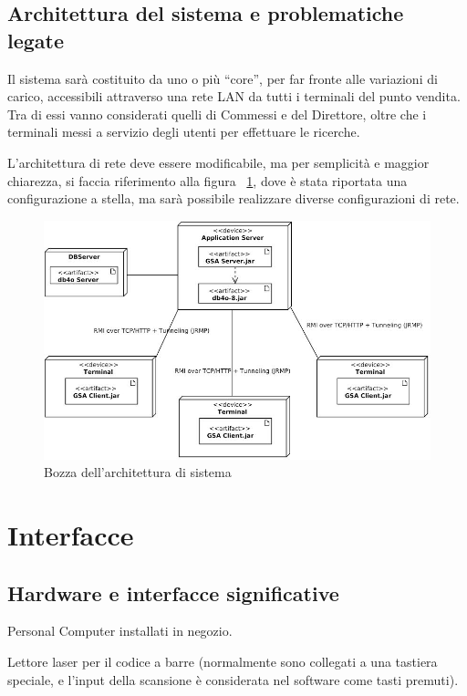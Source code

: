 \documentclass[a4paper,10pt]{report}
\begin{document}
 \subsection*{Architettura del sistema e problematiche legate}
Il sistema sarà costituito da uno o più “core”, per far fronte alle variazioni di carico, accessibili attraverso una rete LAN da tutti i terminali del punto vendita. Tra di essi vanno considerati quelli di Commessi e del Direttore, oltre che i terminali messi a servizio degli utenti per effettuare le ricerche.

L’architettura di rete deve essere modificabile, ma per semplicità e maggior chiarezza, si faccia riferimento alla figura ~\ref{fig:deploy}, dove è stata riportata una configurazione a stella, ma sarà possibile realizzare diverse configurazioni di rete.
\begin{figure}[!ht]
\centering
\includegraphics[width=\textwidth]{Deployment Diagram1.jpg}
\caption{Bozza dell'architettura di sistema}
\label{fig:deploy}
\end{figure}



 \section*{Interfacce}
 \subsection*{Hardware e interfacce significative}
Personal Computer installati in negozio.

Lettore laser per il codice a barre (normalmente sono collegati a una tastiera speciale, e l’input della scansione è considerata nel software come tasti premuti).
\end{document}
